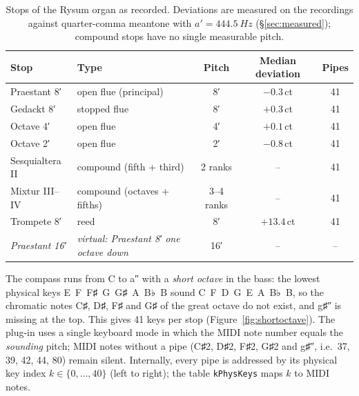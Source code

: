 \documentclass[11pt,a4paper,parskip=half,DIV=11,toc=bibliography]{scrartcl}
\newcommand{\code}[1]{\texttt{#1}}
\newcommand{\ct}{\,ct}
\begin{document}
\begin{table}[h]
\centering\small
\begin{tabular}{@{}llccc@{}}
\toprule
Stop & Type & Pitch & Median deviation & Pipes \\
\midrule
Praestant 8′    & open flue (principal)        & 8′          & $-0.3$\ct  & 41 \\
Gedackt 8′      & stopped flue                 & 8′          & $+0.3$\ct  & 41 \\
Octave 4′       & open flue                    & 4′          & $+0.1$\ct  & 41 \\
Octave 2′       & open flue                    & 2′          & $-0.8$\ct  & 41 \\
Sesquialtera II & compound (fifth + third)     & 2 ranks     & --         & 41 \\
Mixtur III--IV  & compound (octaves + fifths)  & 3--4 ranks  & --         & 41 \\
Trompete 8′     & reed                         & 8′          & $+13.4$\ct & 41 \\
\midrule
\emph{Praestant 16′} & \emph{virtual: Praestant 8′ one octave down} & 16′ & -- & -- \\
\bottomrule
\end{tabular}
\caption{Stops of the Rysum organ as recorded. Deviations are measured on the recordings against
quarter-comma meantone with $a' = \SI{444.5}{Hz}$ (\S\ref{sec:measured}); compound stops have no single
measurable pitch.}
\label{tab:stops}
\end{table}

The compass runs from C to a″ with a \emph{short octave} in the bass: the lowest physical keys
E~F~F♯~G~G♯~A~B♭~B sound C~F~D~G~E~A~B♭~B, so the chromatic notes C♯, D♯, F♯ and G♯ of the
great octave do not exist, and g♯″ is missing at the top. This gives 41 keys per stop
(Figure~\ref{fig:shortoctave}). The plug-in uses a single keyboard mode in which the MIDI note
number equals the \emph{sounding} pitch; MIDI notes without a pipe (C♯2, D♯2, F♯2, G♯2 and
g♯″, i.e.\ 37, 39, 42, 44, 80) remain silent. Internally, every pipe is addressed by its physical key
index $k\in\{0,\dots,40\}$ (left to right); the table \code{kPhysKeys} maps $k$ to MIDI notes.
\end{document}
